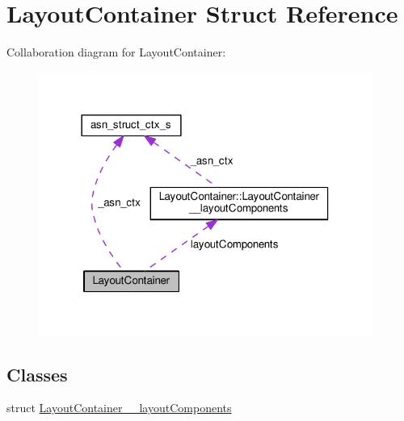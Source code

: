 \hypertarget{structLayoutContainer}{}\section{Layout\+Container Struct Reference}
\label{structLayoutContainer}


Collaboration diagram for Layout\+Container\+:\nopagebreak
\begin{figure}[H]
\begin{center}
\leavevmode
\includegraphics[width=309pt]{structLayoutContainer__coll__graph}
\end{center}
\end{figure}
\subsection*{Classes}
\begin{DoxyCompactItemize}
\item 
struct \hyperlink{structLayoutContainer_1_1LayoutContainer____layoutComponents}{Layout\+Container\+\_\+\+\_\+layout\+Components}
\end{DoxyCompactItemize}
